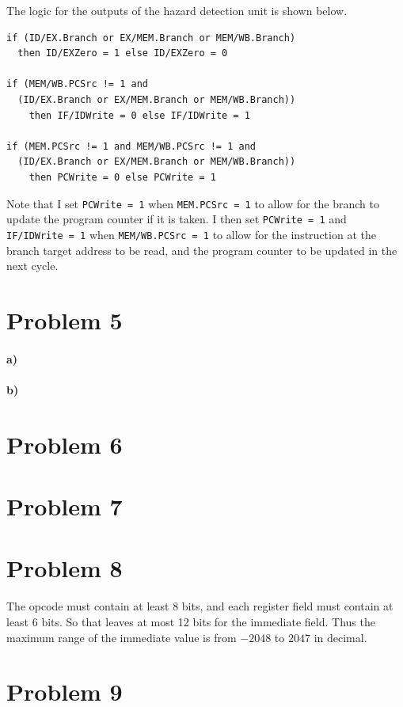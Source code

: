 \documentclass[12pt]{article}
\begin{document}
The logic for the outputs of the hazard detection unit is shown below.
\begin{verbatim}
if (ID/EX.Branch or EX/MEM.Branch or MEM/WB.Branch)
  then ID/EXZero = 1 else ID/EXZero = 0

if (MEM/WB.PCSrc != 1 and
  (ID/EX.Branch or EX/MEM.Branch or MEM/WB.Branch))
    then IF/IDWrite = 0 else IF/IDWrite = 1

if (MEM.PCSrc != 1 and MEM/WB.PCSrc != 1 and
  (ID/EX.Branch or EX/MEM.Branch or MEM/WB.Branch))
    then PCWrite = 0 else PCWrite = 1
\end{verbatim}
Note that I set \texttt{PCWrite = 1} when \texttt{MEM.PCSrc = 1} to allow for the branch to update the program counter if it is taken. I then
set \texttt{PCWrite = 1} and \texttt{IF/IDWrite = 1} when \texttt{MEM/WB.PCSrc = 1} to allow for the instruction at the branch target address to be read, and the
program counter to be updated in the next cycle.

\section*{Problem 5}

\paragraph{a)}

\paragraph{b)}

\section*{Problem 6}

\section*{Problem 7}

\section*{Problem 8}

The opcode must contain at least 8 bits, and each register field must contain at least 6 bits. So that leaves at most 12 bits for the immediate field.
Thus the maximum range of the immediate value is from \(-2048\) to \(2047\) in decimal.

\section*{Problem 9}
\end{document}
